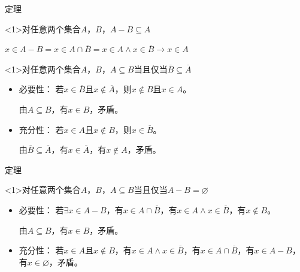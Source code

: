 \documentclass[xetex,10pt,aspectratio=43]{beamer}
\begin{document}
	\begin{frame}{定理}
		
		\begin{block}<1>{对任意两个集合$A$，$B$，$A-B\subseteq A$}
			
			$x\in A-B=x\in A\cap\overline{B}=x\in A\wedge x\in\overline{B}\rightarrow x\in A$
			
		\end{block}
	
		\begin{block}<1>{对任意两个集合$A$，$B$，$A\subseteq B$当且仅当$\overline{B}\subseteq\overline{A}$}
			
			\begin{itemize}
				
				\item<1>必要性：
				若$x\in \overline{B}$且$x\notin \overline{A}$，则$x\notin B$且$x\in A$。
				
				由$A\subseteq B$，有$x\in B$，矛盾。
				
				\item<1>充分性：
				若$x\in A$且$x\notin B$，则$x\in \overline{B}$。
				
				由$\overline{B}\subseteq\overline{A}$，有$x\in\overline{A}$，有$x\notin A$，矛盾。
				
			\end{itemize}
		
		\end{block}
	
	\end{frame}

	\begin{frame}{定理}
		
		\begin{block}<1>{对任意两个集合$A$，$B$，$A\subseteq B$当且仅当$A-B=\varnothing$}
			
			\begin{itemize}
				
				\item<1>必要性：
				若$\exists x\in A-B$，有$x\in A\cap\overline{B}$，有$x\in A\wedge x\in\overline{B}$，有$x\notin B$。
				
				由$A\subseteq B$，有$x\in B$，矛盾。
				
				\item<1>充分性：
				若$x\in A$且$x\notin B$，有$x\in A\wedge x\in\overline{B}$，有$x\in A\cap\overline{B}$，有$x\in A-B$，有$x\in\varnothing$，矛盾。
				
			\end{itemize}
		
		\end{block}
	
	\end{frame}
\end{document}
